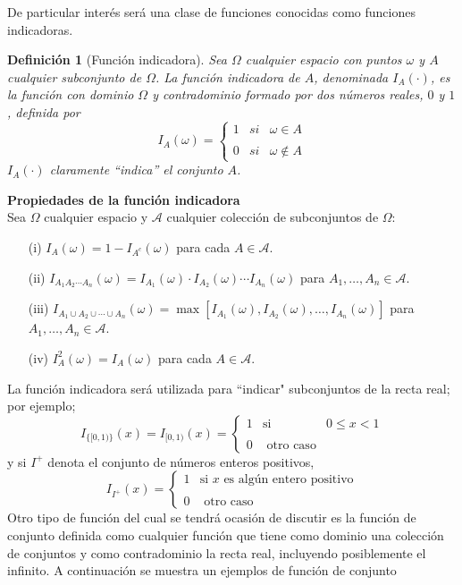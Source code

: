\documentclass[12pt]{article}
\newtheorem{definition}{Definición}
\begin{document}
De particular interés será una clase de funciones conocidas como funciones indicadoras.
\begin{definition}[Función indicadora]
    Sea $\Omega$ cualquier espacio con puntos $\omega$ y $A$ cualquier subconjunto de $\Omega$. La función indicadora de $A$, denominada $I_A(\cdot)$, es la función con dominio $\Omega$ y contradominio formado por dos números reales, $0$ y $1$, definida por
    $$I_A(\omega)= \left\{ \begin{array}{lcc} 1 & si & \omega \in A\\ \\ 0 & si & \omega \notin A \end{array} \right.$$
    $I_A(\cdot)$ claramente ``indica'' el conjunto $A$.
\end{definition}

\textbf{Propiedades de la función indicadora}\\
Sea $\Omega$ cualquier espacio y  $\mathscr A$ cualquier colección de subconjuntos de $\Omega$:
\begin{itemize}
    \item[(i)] $I_A(\omega)= 1- I_{A^c}(\omega)$ para cada $A\in \mathscr A$. 
    \item[(ii)] $I_{A_1A_2\cdots A_n}(\omega)= I_{A_1}(\omega)\cdot I_{A_2}(\omega)\cdots I_{A_n}(\omega)$  para $A_1,\ldots, A_n\in \mathscr A$.
    \item[(iii)] $I_{A_1\cup A_2\cup\cdots\cup A_n}(\omega)= \max{[I_{A_1}(\omega), I_{A_2}(\omega),\ldots, I_{A_n}(\omega)]}$ para $A_1, \ldots, A_n \in\mathscr A$.
    \item[(iv)] $I_A^2(\omega)= I_A(\omega)$ para cada $A\in\mathscr A$. 
\end{itemize}
La función indicadora será utilizada para ``indicar" subconjuntos de la recta real; por ejemplo;
$$I_{\{[0,1)\}}(x)= I_{[0,1)}(x)=\left\{ \begin{array}{lcc} 1 & \text{si} & 0\leq x<1\\ \\ 0 & \text{ otro caso} \end{array} \right. $$
y si $I^+$ denota el conjunto de números enteros positivos,
$$I_{I^+}(x)=\left\{ \begin{array}{lcc} 1 & \text{si $x$ es algún entero positivo}\\ \\ 0 & \text{ otro caso} \end{array} \right. $$
Otro tipo de función del cual se tendrá ocasión de discutir es la función de conjunto definida como cualquier función que tiene como dominio una colección de conjuntos y como contradominio la recta real, incluyendo posiblemente el infinito. A continuación se muestra un ejemplos de función de conjunto
\end{document}
